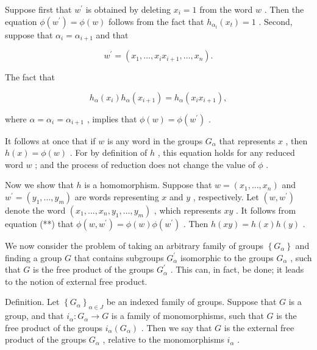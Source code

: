 Suppose first that \({w}^{\prime }\) is obtained by deleting \({x}_{i} = 1\) from the word \(w\) . Then the equation \(\phi \left( {w}^{\prime }\right)  = \phi \left( w\right)\) follows from the fact that \({h}_{{\alpha }_{t}}\left( {x}_{t}\right)  = 1\) . Second, suppose that \({\alpha }_{i} = {\alpha }_{i + 1}\) and that

\[
{w}^{\prime } = \left( {{x}_{1},\ldots ,{x}_{i}{x}_{i + 1},\ldots ,{x}_{n}}\right) .
\]

The fact that

\[
{h}_{\alpha }\left( {x}_{i}\right) {h}_{\alpha }\left( {x}_{i + 1}\right)  = {h}_{\alpha }\left( {{x}_{i}{x}_{i + 1}}\right) ,
\]

where \(\alpha  = {\alpha }_{i} = {\alpha }_{i + 1}\) , implies that \(\phi \left( w\right)  = \phi \left( {w}^{\prime }\right)\) .

It follows at once that if \(w\) is any word in the groups \({G}_{\alpha }\) that represents \(x\) , then \(h\left( x\right)  = \phi \left( w\right)\) . For by definition of \(h\) , this equation holds for any reduced word \(w\) ; and the process of reduction does not change the value of \(\phi\) .

Now we show that \(h\) is a homomorphism. Suppose that \(w = \left( {{x}_{1},\ldots ,{x}_{n}}\right)\) and \({w}^{\prime } = \left( {{y}_{1},\ldots ,{y}_{m}}\right)\) are words representing \(x\) and \(y\) , respectively. Let \(\left( {w,{w}^{\prime }}\right)\) denote the word \(\left( {{x}_{1},\ldots ,{x}_{n},{y}_{1},\ldots ,{y}_{m}}\right)\) , which represents \({xy}\) . It follows from equation (**) that \(\phi \left( {w,{w}^{\prime }}\right)  = \phi \left( w\right) \phi \left( {w}^{\prime }\right)\) . Then \(h\left( {xy}\right)  = h\left( x\right) h\left( y\right)\) .

We now consider the problem of taking an arbitrary family of groups \(\left\{  {G}_{\alpha }\right\}\) and finding a group \(G\) that contains subgroups \({G}_{\alpha }^{\prime }\) isomorphic to the groups \({G}_{\alpha }\) , such that \(G\) is the free product of the groups \({G}_{\alpha }^{\prime }\) . This can, in fact, be done; it leads to the notion of external free product.

Definition. Let \({\left\{  {G}_{\alpha }\right\}  }_{\alpha  \in  J}\) be an indexed family of groups. Suppose that \(G\) is a group, and that \({i}_{\alpha } : {G}_{\alpha } \rightarrow  G\) is a family of monomorphisms, such that \(G\) is the free product of the groups \({i}_{\alpha }\left( {G}_{\alpha }\right)\) . Then we say that \(G\) is the external free product of the groups \({G}_{\alpha }\) , relative to the monomorphisms \({i}_{\alpha }\) .

